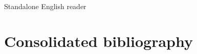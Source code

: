 \begin{center}
\large Standalone English reader
\end{center}

\tableofcontents


\setcounter{section}{1}







\clearpage
{}
{}
\section*{Consolidated bibliography}
\nocite{*}




